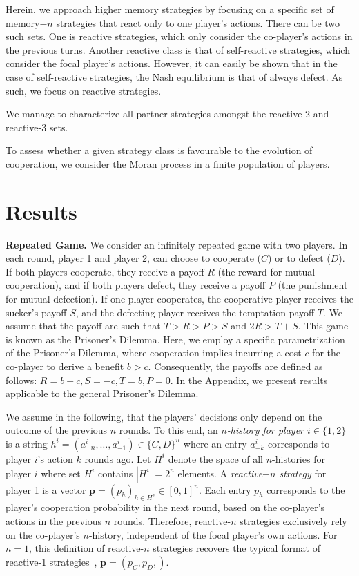 \documentclass{article}
\theoremstyle{definition}
\begin{document}
Herein, we approach higher memory strategies by focusing on a specific set of
memory$-n$ strategies that react only to one player's actions. There can be two
such sets. One is reactive strategies, which only consider the co-player's
actions in the previous turns. Another reactive class is that of self-reactive
strategies, which consider the focal player's actions. However, it can easily be
shown that in the case of self-reactive strategies, the Nash equilibrium is that
of always defect. As such, we focus on reactive strategies.

We manage to characterize all partner strategies amongst the reactive-2 and
reactive-3 sets.

To assess whether a given strategy class is favourable to the evolution of
cooperation, we consider the Moran process in a finite population of players.

\section{Results}

\textbf{Repeated Game.}
We consider an infinitely repeated game with two players. In each round, player 1
and player 2, can choose to cooperate ($C$) or to defect ($D$). If both players
cooperate, they receive a payoff $R$ (the reward for mutual cooperation), and if
both players defect, they receive a payoff $P$ (the punishment for mutual
defection). If one player cooperates, the cooperative player receives the
sucker's payoff $S$, and the defecting player receives the temptation payoff
$T$. We assume that the payoff are such that $T > R > P > S$ and $2 R > T + S$.
This game is known as the Prisoner's Dilemma. Here, we
employ a specific parametrization of the Prisoner's Dilemma, where cooperation
implies incurring a cost $c$ for the co-player to derive a benefit $b > c$.
Consequently, the payoffs are defined as follows: \(R = b - c, S = -c, T = b, P =
0\). In the Appendix, we present results applicable to the general Prisoner's
Dilemma.

We assume in the following, that the players' decisions only depend on the
outcome of the previous $n$ rounds. To this end, an {\it $n$-history for player
$i \in \{1, 2\}$} is a string $h^i=(a^i_{-n},\ldots,a^i_{-1})\!\in\!\{C,D\}^n$
where an entry $a^i_{-k}$ corresponds to player $i$'s action $k$ rounds ago. Let
$H^i$ denote the space of all $n$-histories for player $i$ where set $H^i$ contains
$|H^i|=2^{n}$ elements. A {\it reactive$-n$ strategy} for player 1 is a vector
$\mathbf{p}=(p_h)_{h\in H^2} \in [0, 1]^{n}$. Each entry $p_h$ corresponds to
the player's cooperation probability in the next round, based on the co-player's
actions in the previous $n$ rounds. Therefore, reactive-$n$ strategies
exclusively rely on the co-player's $n$-history, independent of the focal
player's own actions. For \(n=1\), this definition of reactive-\(n\) strategies
recovers the typical format of reactive-1 strategies~\cite{baek:scientific:2016, wahl:JTB:1999, mcavoy:PRSA:2019},
\(\mathbf{p}=(p_C, p_D,)\).
\end{document}
